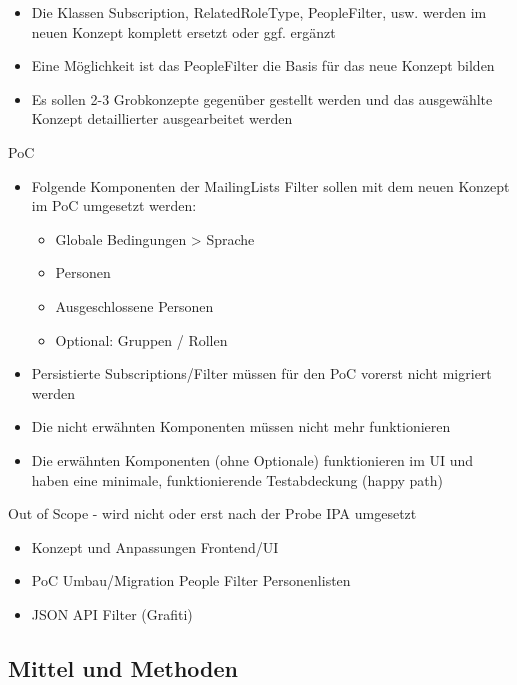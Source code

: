 \begin{itemize}
    \item Die Klassen Subscription, RelatedRoleType, PeopleFilter, usw. werden im neuen Konzept komplett ersetzt oder ggf. ergänzt
    \item Eine Möglichkeit ist das PeopleFilter die Basis für das neue Konzept bilden
    \item Es sollen 2-3 Grobkonzepte gegenüber gestellt werden und das ausgewählte Konzept detaillierter ausgearbeitet werden
\end{itemize}

PoC

\begin{itemize}
\item Folgende Komponenten der MailingLists Filter sollen mit dem neuen Konzept im PoC umgesetzt werden:
    \begin{itemize}
        \item Globale Bedingungen > Sprache
        \item Personen
        \item Ausgeschlossene Personen
        \item Optional: Gruppen / Rollen
    \end{itemize}    
\item Persistierte Subscriptions/Filter müssen für den PoC vorerst nicht migriert werden
\item Die nicht erwähnten Komponenten müssen nicht mehr funktionieren
\item Die erwähnten Komponenten (ohne Optionale) funktionieren im UI und haben eine minimale, funktionierende Testabdeckung (happy path)
\end{itemize}

\newpage

Out of Scope - wird nicht oder erst nach der Probe IPA umgesetzt

\begin{itemize}
    \item Konzept und Anpassungen Frontend/UI
    \item PoC Umbau/Migration People Filter Personenlisten
    \item JSON API Filter (Grafiti)
\end{itemize}

\newpage

\subsection{Mittel und Methoden}

